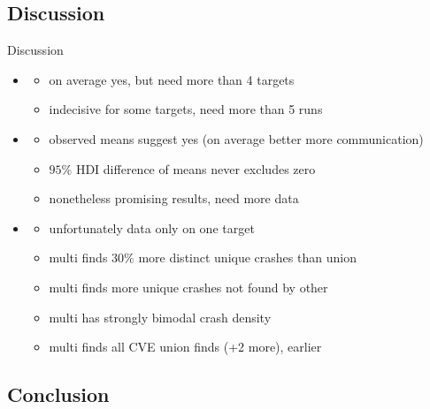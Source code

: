 \documentclass[\HandoutMode,table]{beamer}
\begin{document}
\subsection*{Discussion}

\begin{frame}
    {Discussion}
    \begin{itemize}
        \item{} 
            \begin{itemize}
                \item{} on average yes, but need more than 4 targets
                \item{} indecisive for some targets, need more than 5 runs
            \end{itemize}
        \item{} 
            \begin{itemize}
                \item{} observed means suggest yes (on average better more
                    communication)
                \item{} $95\%$ HDI difference of means never excludes zero
                \item{} nonetheless promising results, need more data
            \end{itemize}
        \item{} 
            \begin{itemize}
                \item{} unfortunately data only on one target
                \item{} multi finds $30\%$ more distinct unique crashes than union
                \item{} multi finds more unique crashes not found by other
                \item{} multi has strongly bimodal crash density
                \item{} multi finds all CVE union finds (+2 more), earlier
            \end{itemize}
    \end{itemize}
\end{frame}

\subsection*{Conclusion}
\end{document}
